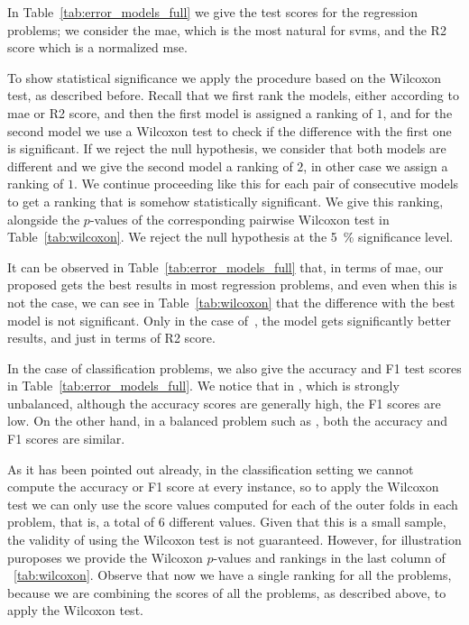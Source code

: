 In Table~\ref{tab:error_models_full} we give the test scores for the regression problems; we consider the \acrshort{mae}, which is the most natural for \acrshort{svms}, and the R2 score which is a normalized \acrshort{mse}.

To show statistical significance we apply the procedure based on the Wilcoxon test, as described before. Recall that we first rank the models, either according to \acrshort{mae} or R2 score, and then the first model is assigned a ranking of $1$, and for the second model we use a Wilcoxon test to check if the difference with the first one is significant. If we reject the null hypothesis, we consider that both models are different and we give the second model a ranking of $2$, in other case we assign a ranking of $1$. We continue proceeding like this for each pair of consecutive models to get a ranking that is somehow statistically significant. We give this ranking, alongside the $p$-values of the corresponding pairwise Wilcoxon test in Table~\ref{tab:wilcoxon}.
%
 We 
 reject the null hypothesis at the \SI{5}{\percent} significance level.
%

It can be observed in Table~\ref{tab:error_models_full} that, in terms of \acrshort{mae}, our proposed  gets the best results in most regression problems, and even when this is not the case, we can see in Table~\ref{tab:wilcoxon} that the difference with the best model is not significant. Only in the case of~, the  model gets significantly better results, and just in terms of R2 score.
%

In the case of classification problems, we also give the accuracy and F1 test scores in Table~\ref{tab:error_models_full}. We notice that in , which is strongly unbalanced, although the accuracy scores are generally high, the F1 scores are low. On the other hand, in a balanced problem such as , both the accuracy and F1 scores are similar.
%

As it has been pointed out already, in the classification setting we cannot compute the accuracy or F1 score at every instance, so to apply the Wilcoxon test we can only use the score values computed for each of the outer folds in each problem, that is, a total of $6$ different values.
Given that this is a small sample, the validity of using the Wilcoxon test is not guaranteed. However, for illustration puroposes we provide the Wilcoxon $p$-values and rankings in the last column of ~\ref{tab:wilcoxon}. Observe that now we have a single ranking for all the problems, because we are combining the scores of all the problems, as described above, to apply the Wilcoxon test.


